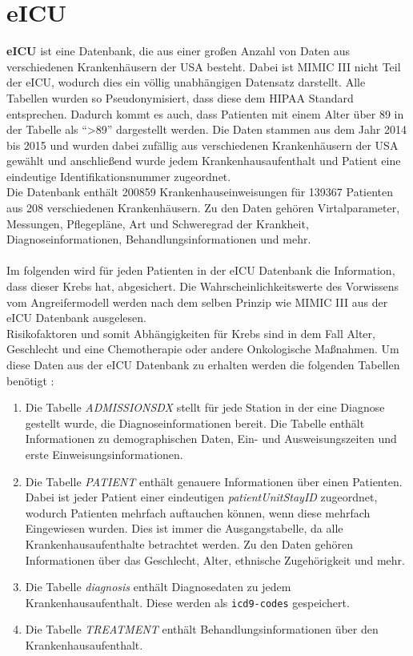 \documentclass[german,version-2020-11]{uzl-thesis}
\begin{document}
\section{eICU}
\textbf{eICU} ist eine Datenbank, die aus einer großen Anzahl von Daten aus verschiedenen Krankenhäusern der USA besteht. Dabei ist MIMIC III nicht Teil der eICU, wodurch dies ein völlig unabhängigen Datensatz darstellt. Alle Tabellen wurden so Pseudonymisiert, dass diese dem HIPAA Standard entsprechen. Dadurch kommt es auch, dass Patienten mit einem Alter über 89 in der Tabelle als \enquote{>89} dargestellt werden. Die Daten stammen aus dem Jahr 2014 bis 2015 und wurden dabei zufällig aus verschiedenen Krankenhäusern der USA gewählt und anschließend wurde jedem Krankenhausaufenthalt und Patient eine eindeutige Identifikationsnummer zugeordnet. \\ 
Die Datenbank enthält 200859 Krankenhauseinweisungen für 139367 Patienten aus 208 verschiedenen Krankenhäusern. Zu den Daten gehören Virtalparameter, Messungen, Pflegepläne, Art und Schweregrad der Krankheit, Diagnoseinformationen, Behandlungsinformationen und mehr. \\ \\
Im folgenden wird für jeden Patienten in der eICU Datenbank die Information, dass dieser Krebs hat, abgesichert. Die Wahrscheinlichkeitswerte des Vorwissens vom Angreifermodell werden nach dem selben Prinzip wie MIMIC III aus der eICU Datenbank ausgelesen. \\ 
Risikofaktoren und somit Abhängigkeiten für Krebs sind in dem Fall Alter, Geschlecht und eine Chemotherapie oder andere Onkologische Maßnahmen\cite{13,14}. Um diese Daten aus der eICU Datenbank zu erhalten werden die folgenden Tabellen benötigt : 
\begin{enumerate}
	\item Die Tabelle \textit{ADMISSIONSDX} stellt für jede Station in der eine Diagnose gestellt wurde, die Diagnoseinformationen bereit. Die Tabelle enthält Informationen zu demographischen Daten, Ein- und Ausweisungszeiten und erste Einweisungsinformationen.
	\item Die Tabelle \textit{PATIENT} enthält genauere Informationen über einen Patienten.  Dabei ist jeder Patient einer eindeutigen \textit{patientUnitStayID} zugeordnet, wodurch Patienten mehrfach auftauchen können, wenn diese mehrfach Eingewiesen wurden. Dies ist immer die Ausgangstabelle, da alle Krankenhausaufenthalte betrachtet werden. Zu den Daten gehören Informationen über das Geschlecht, Alter, ethnische Zugehörigkeit und mehr.
	\item Die Tabelle \textit{diagnosis} enthält Diagnosedaten zu jedem Krankenhausaufenthalt. Diese werden als \texttt{icd9-codes} gespeichert.
	\item Die Tabelle \textit{TREATMENT } enthält Behandlungsinformationen über den Krankenhausaufenthalt.
\end{enumerate} 
\end{document}
